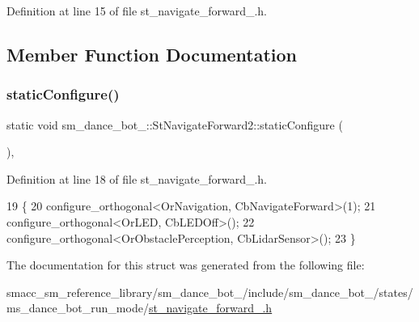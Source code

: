 Definition at line 15 of file st\+\_\+navigate\+\_\+forward\+\_.\+h.



\subsection{Member Function Documentation}
\mbox{\label{structsm__dance__bot__2_1_1StNavigateForward2_a95f49a400b7ffb55303819076c06c3bd}} 
\subsubsection{\texorpdfstring{static\+Configure()}{staticConfigure()}}
{\footnotesize\ttfamily static void sm\+\_\+dance\+\_\+bot\+\_\+::\+St\+Navigate\+Forward2\+::static\+Configure (\begin{DoxyParamCaption}{ }\end{DoxyParamCaption})\hspace{0.3cm}{\ttfamily [inline]}, {\ttfamily [static]}}



Definition at line 18 of file st\+\_\+navigate\+\_\+forward\+\_.\+h.


\begin{DoxyCode}
19   \{
20     configure\_orthogonal<OrNavigation, CbNavigateForward>(1);
21     configure\_orthogonal<OrLED, CbLEDOff>();
22     configure\_orthogonal<OrObstaclePerception, CbLidarSensor>();
23   \}
\end{DoxyCode}


The documentation for this struct was generated from the following file\+:\begin{DoxyCompactItemize}
\item 
smacc\+\_\+sm\+\_\+reference\+\_\+library/sm\+\_\+dance\+\_\+bot\+\_/include/sm\+\_\+dance\+\_\+bot\+\_/states/ms\+\_\+dance\+\_\+bot\+\_\+run\+\_\+mode/\hyperlink{sm__dance__bot__2_2include_2sm__dance__bot__2_2states_2ms__dance__bot__run__mode_2st__navigate__forward__2_8h}{st\+\_\+navigate\+\_\+forward\+\_.\+h}\end{DoxyCompactItemize}
